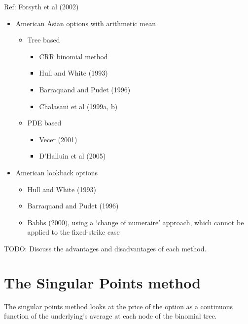 Ref: Forsyth et al (2002)

\begin{itemize}
\item American Asian options with arithmetic mean
	\begin{itemize}
	\item Tree based
		\begin{itemize}
		\item CRR binomial method
		\item Hull and White (1993)
		\item Barraquand and Pudet (1996)
		\item Chalasani et al (1999a, b)
		\end{itemize}
	\item PDE based
		\begin{itemize}
		\item Vecer (2001)
		\item D’Halluin et al (2005)
		\end{itemize}
	\end{itemize}
\item American lookback options
	\begin{itemize}
	\item Hull and White (1993)
	\item Barraquand and Pudet (1996)
	\item Babbs (2000), using a `change of numeraire' approach, which cannot be applied to the fixed-strike case
	\end{itemize}
\end{itemize}

TODO: Discuss the advantages and disadvantages of each method.



\section{The Singular Points method}
\label{sec:sp-method}

The singular points method looks at the price of the option as a continuous function of the underlying's average at each node of the binomial tree.


